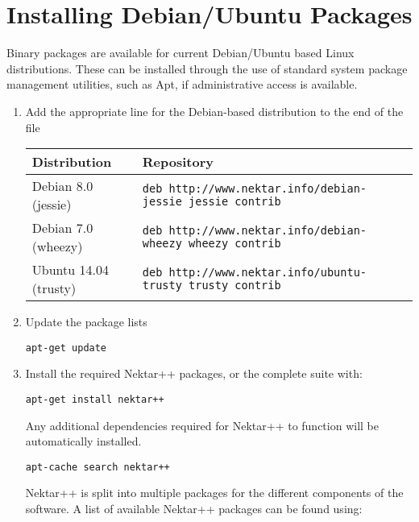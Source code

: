 \section{Installing Debian/Ubuntu Packages}
\label{s:installation:debian}
Binary packages are available for current Debian/Ubuntu based Linux
distributions. These can be installed through the use of standard system package
management utilities, such as Apt, if administrative access is
available.

\begin{enumerate}
	\item Add the appropriate line for the Debian-based distribution to the end of
	the file 
	
	{\small
	\begin{tabular}{ll}
	\toprule
	Distribution & Repository \\
	\midrule
    Debian 8.0 (jessie) &
       \texttt{deb http://www.nektar.info/debian-jessie jessie contrib} \\
	Debian 7.0 (wheezy) & 
	   \texttt{deb http://www.nektar.info/debian-wheezy wheezy contrib} \\
	Ubuntu 14.04 (trusty) & 
	   \texttt{deb http://www.nektar.info/ubuntu-trusty trusty contrib}\\
	\bottomrule
	\end{tabular}
	}
	\item Update the package lists
	\begin{lstlisting}[style=BashInputStyle]
	apt-get update
	\end{lstlisting}
	\item Install the required Nektar++ packages, or the complete suite with:
	\begin{lstlisting}[style=BashInputStyle]
	apt-get install nektar++
	\end{lstlisting}
	Any additional dependencies required for Nektar++ to function will be
	automatically installed.
	
    \newsavebox\installationDebTip
    \begin{lrbox}{\installationDebTip}\begin{minipage}{0.8\linewidth}
    \begin{lstlisting}[style=BashInputStyle]
    apt-cache search nektar++
    \end{lstlisting}
    \end{minipage}
    \end{lrbox}
	
	\begin{tipbox}
	Nektar++ is split into multiple packages for the different components of the
	software. A list of available Nektar++ packages can be found using:
	\noindent\usebox\installationDebTip
	\end{tipbox}
\end{enumerate}



